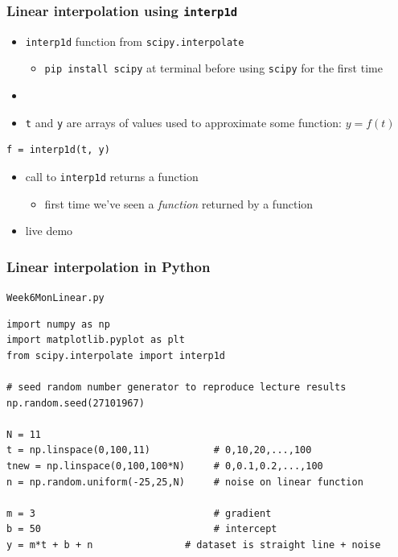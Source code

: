 \documentclass[english,14pt]{beamer}
\begin{document}

\begin{frame}[fragile]

\frametitle{Linear interpolation using \texttt{interp1d}}

\begin{itemize}
	\item \texttt{interp1d} function from \texttt{scipy.interpolate}
	\begin{itemize}
		\item \texttt{pip install scipy} at terminal before using \texttt{scipy} for the first time
	\end{itemize}
	\item[]
	\item \texttt{t} and \texttt{y} are arrays of values used to approximate some function: $y = f(t)$
\end{itemize}

\begin{lstlisting}[style=CStyle,basicstyle=\large]
f = interp1d(t, y)
\end{lstlisting}	
\begin{itemize}
	\item call to \texttt{interp1d} returns a function
	\begin{itemize}
		\item first time we've seen a \emph{function} returned by a function
	\end{itemize}
	\item live demo
\end{itemize}

\end{frame}


\begin{frame}[fragile]

\frametitle{Linear interpolation in Python}

\texttt{Week6MonLinear.py}

\begin{lstlisting}[style=CStyle,basicstyle=\scriptsize]
import numpy as np
import matplotlib.pyplot as plt
from scipy.interpolate import interp1d

# seed random number generator to reproduce lecture results
np.random.seed(27101967)

N = 11
t = np.linspace(0,100,11)           # 0,10,20,...,100
tnew = np.linspace(0,100,100*N)     # 0,0.1,0.2,...,100
n = np.random.uniform(-25,25,N)     # noise on linear function

m = 3                               # gradient
b = 50                              # intercept
y = m*t + b + n                # dataset is straight line + noise
\end{lstlisting}
\end{frame}
\end{document}
